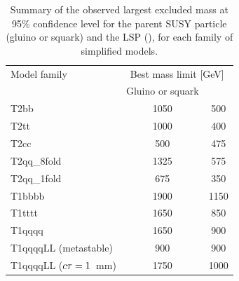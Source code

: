 \begin{table}%
	\centering
	\begin{tabular}{ lcc }
		\hline
		Model family                    & \multicolumn{2}{c}{Best mass limit 
		[GeV]} \\ [0.5ex]
		\cline{2-3}
		& Gluino or squark & \neutralino               \\ [0.5ex]
		\hline
		T2bb                            & 1050             & 
		\phantom{1}500              \\
		T2tt                            & 1000             & 
		\phantom{1}400              \\
		T2cc                            & \phantom{1}500        & 
		\phantom{1}475              \\
		T2qq\_8fold                     & 1325             & 
		\phantom{1}575              \\
		T2qq\_1fold                     & \phantom{1}675        & 
		\phantom{1}350              \\
		T1bbbb                          & 1900             & 
		1150                   \\
		T1tttt                          & 1650             & 
		\phantom{1}850              \\
		T1qqqq                          & 1650             & 
		\phantom{1}900              \\
		T1qqqqLL (metastable)    & \phantom{1}900        & 
		\phantom{1}900                     \\
		T1qqqqLL ($c\tau = 1$~mm) & 1750             & 
		1000                   \\
		\hline
	\end{tabular}
\caption{Summary of the observed largest excluded mass at 95\% confidence level 
for the parent SUSY particle (gluino or squark) and the LSP (\neutralino), for 
each family of simplified models.}
\label{tab:limits}
\end{table}



